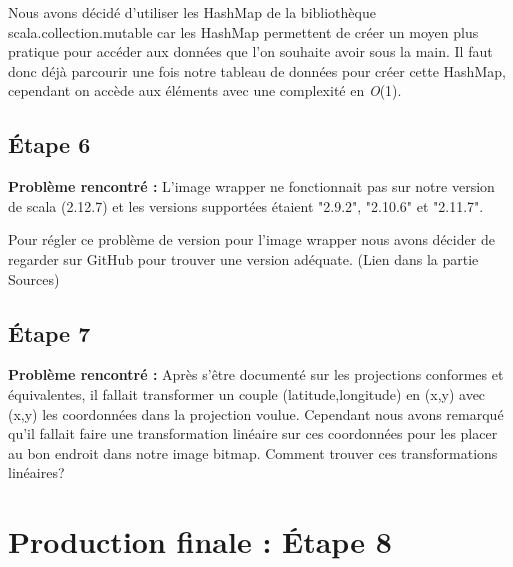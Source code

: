 \documentclass{article}
\begin{document}
\vspace{1\baselineskip}

 \newline
Nous avons décidé d'utiliser les HashMap de la bibliothèque scala.collection.mutable car les HashMap permettent de créer un moyen plus pratique pour accéder aux données que l'on souhaite avoir sous la main. Il faut donc déjà parcourir une fois notre tableau de données pour créer cette HashMap, cependant on accède aux éléments avec une complexité en \textit{O}(1).

\vspace{1\baselineskip}
\color{orange}
\subsection{Étape 6} 
\color{purple}

\textbf{Problème rencontré :} \newline
L'image wrapper ne fonctionnait pas sur notre version de scala (2.12.7) et les versions supportées étaient "2.9.2", "2.10.6" et "2.11.7".

\vspace{1\baselineskip}

 \newline
Pour régler ce problème de version pour l'image wrapper nous avons décider de regarder sur GitHub pour trouver une version adéquate. (Lien dans la partie Sources)

\color{orange}
\subsection{Étape 7}
\color{purple}

\textbf{Problème rencontré :} \newline
Après s'être documenté sur les projections conformes et équivalentes, il fallait transformer un couple (latitude,longitude) en (x,y) avec (x,y) les coordonnées dans la projection voulue. Cependant nous avons remarqué qu'il fallait faire une transformation linéaire sur ces coordonnées pour les placer au bon endroit dans notre image bitmap. Comment trouver ces transformations linéaires?

\vspace{1\baselineskip}




\color{orange} \section{ Production finale : Étape 8}
\color{purple}
\end{document}
